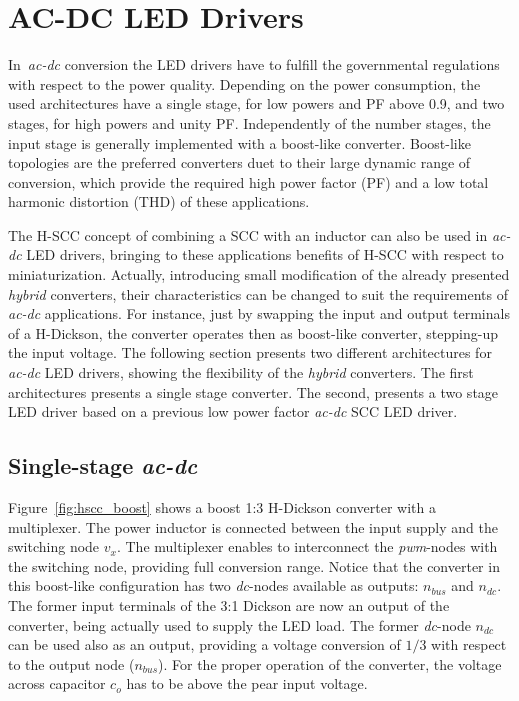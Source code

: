 
\section{AC-DC LED Drivers}
In~\emph{ac-dc} conversion the LED drivers have to fulfill the governmental regulations  with respect to the power quality.
Depending on the power consumption, the used architectures have a single stage, for low powers and PF above 0.9, and two stages, for high powers and unity PF.  Independently of the number stages, the input stage is generally implemented with a boost-like converter. Boost-like topologies are the preferred converters duet to their large dynamic range of conversion, which provide the required high power factor (PF) and a low total harmonic distortion (THD) of these applications.

The H-SCC concept of combining a SCC with an inductor can also be used in \emph{ac-dc} LED drivers,  bringing to these applications benefits of H-SCC with respect to miniaturization. Actually, introducing small modification of the already presented \emph{hybrid} converters, their characteristics can be changed to suit the requirements of \emph{ac-dc} applications. For instance, just by swapping the input and output terminals of a H-Dickson, the converter operates then as boost-like converter, stepping-up the input voltage. The following section presents two different architectures for \emph{ac-dc} LED drivers, showing the flexibility of the \emph{hybrid} converters. The first architectures presents a single stage converter. The second, presents a two stage LED driver based on a previous low power factor \emph{ac-dc} SCC LED driver.


\subsection{Single-stage \emph{ac-dc}}

Figure~\ref{fig:hscc_boost} shows a boost 1:3 H-Dickson converter with a multiplexer. The power inductor is connected between the input supply and the switching node $v_x$. The multiplexer enables to interconnect the \emph{pwm}-nodes with the switching node, providing full conversion range. Notice that the converter in this boost-like configuration has two \emph{dc}-nodes available as outputs: $n_{bus}$ and $n_{dc}$. The former input terminals of the 3:1 Dickson are now an output of the converter, being actually used to supply the LED load. The former \emph{dc}-node $n_{dc}$ can be used also as an output, providing a voltage conversion of $1/3$ with respect to the output node ($n_{bus}$). For the proper operation of the converter, the voltage across capacitor $c_o$  has to be above the pear input voltage.

